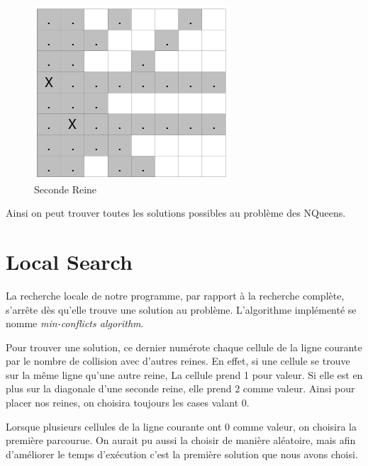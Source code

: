 \documentclass{article}
\begin{document}
\begin{figure}[h]
\caption{\label{reine2} Seconde Reine}
\begin{center}
\includegraphics[scale=0.5]{./picture/pruning2.png}
\end{center}
\end{figure}

Ainsi on peut trouver toutes les solutions possibles au problème des NQueens.


\section{Local Search}

La recherche locale de notre programme, par rapport à la recherche complète, s'arrête dès qu'elle trouve une solution au problème. L'algorithme implémenté se nomme
\emph{min-conflicts algorithm}. 

Pour trouver une solution, ce dernier numérote chaque cellule de la ligne courante par le nombre de collision avec d'autres reines. En effet, si une cellule se trouve sur la même ligne qu'une autre reine, La cellule prend 1 pour valeur. Si elle est en plus sur la diagonale d'une seconde reine, elle prend 2 comme valeur.
Ainsi pour placer nos reines, on choisira toujours les cases valant 0.

Lorsque plusieurs cellules de la ligne courante ont 0 comme valeur, on choisira la première parcourue. On aurait pu aussi la choisir de manière aléatoire, mais afin d'améliorer le temps d'exécution c'est la première solution que nous avons choisi. 
\end{document}
